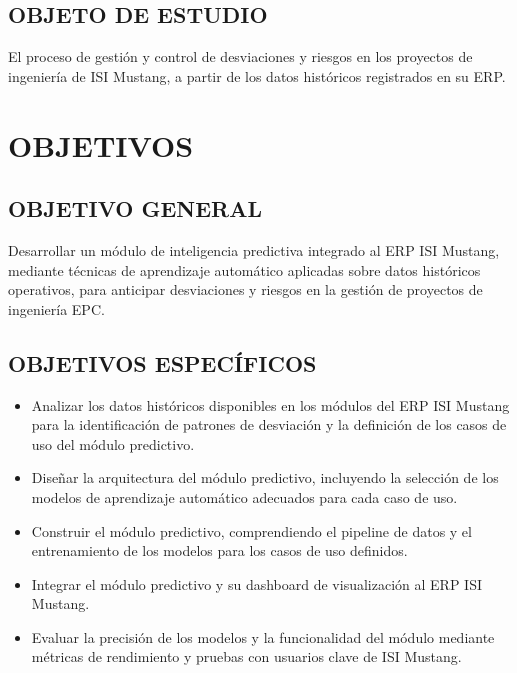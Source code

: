 \documentclass{univalle-perfil}
\begin{document}
\subsection{OBJETO DE ESTUDIO}

El proceso de gestión y control de desviaciones y riesgos en los proyectos de ingeniería de ISI Mustang, a partir de los datos históricos registrados en su ERP.

\section{OBJETIVOS}

\subsection{OBJETIVO GENERAL}

Desarrollar un módulo de inteligencia predictiva integrado al ERP ISI Mustang, mediante técnicas de aprendizaje automático aplicadas sobre datos históricos operativos, para anticipar desviaciones y riesgos en la gestión de proyectos de ingeniería EPC.

\subsection{OBJETIVOS ESPECÍFICOS}

\begin{itemize}
    \item Analizar los datos históricos disponibles en los módulos del ERP ISI Mustang para la identificación de patrones de desviación y la definición de los casos de uso del módulo predictivo.
    \item Diseñar la arquitectura del módulo predictivo, incluyendo la selección de los modelos de aprendizaje automático adecuados para cada caso de uso.
    \item Construir el módulo predictivo, comprendiendo el pipeline de datos y el entrenamiento de los modelos para los casos de uso definidos.
    \item Integrar el módulo predictivo y su dashboard de visualización al ERP ISI Mustang.
    \item Evaluar la precisión de los modelos y la funcionalidad del módulo mediante métricas de rendimiento y pruebas con usuarios clave de ISI Mustang.
\end{itemize}
\end{document}

